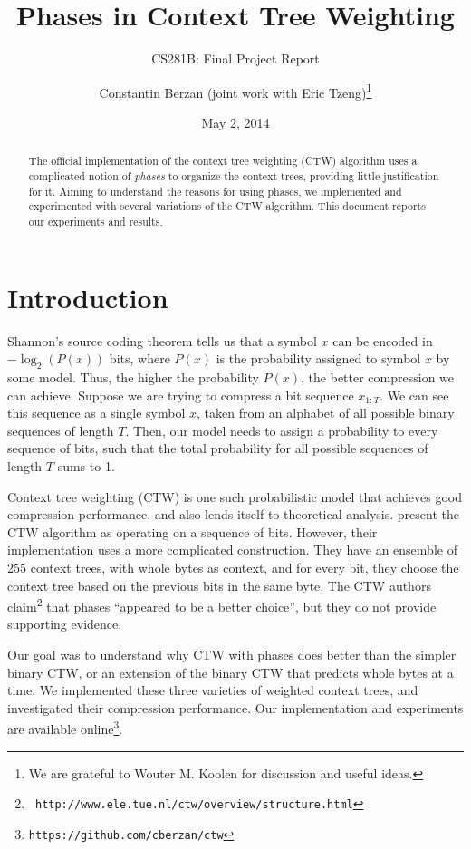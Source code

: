 \documentclass[11pt]{scrartcl}
\title{Phases in Context Tree Weighting}
\subtitle{CS281B: Final Project Report}
\author{Constantin Berzan (joint work with Eric Tzeng)\footnote{We are grateful
to Wouter M. Koolen for discussion and useful ideas.}}
\date{May 2, 2014}
\begin{document}
\maketitle

\begin{abstract}
The official implementation of the context tree weighting (CTW) algorithm uses
a complicated notion of {\em phases} to organize the context trees, providing
little justification for it. Aiming to understand the reasons for using phases,
we implemented and experimented with several variations of the CTW algorithm.
This document reports our experiments and results.
\end{abstract}

\section{Introduction}
\label{sec:intro}

Shannon's source coding theorem tells us that a symbol $x$ can be encoded in
$-\log_2(P(x))$ bits, where $P(x)$ is the probability assigned to symbol $x$ by
some model. Thus, the higher the probability $P(x)$, the better compression we
can achieve. Suppose we are trying to compress a bit sequence $x_{1:T}$. We can
see this sequence as a single symbol $x$, taken from an alphabet of all
possible binary sequences of length $T$. Then, our model needs to assign a
probability to every sequence of bits, such that the total probability for all
possible sequences of length $T$ sums to 1.

Context tree weighting (CTW) is one such probabilistic model that achieves good
compression performance, and also lends itself to theoretical analysis.
\textcite{eidma} present the CTW algorithm as operating on a sequence of bits.
However, their implementation uses a more complicated construction. They have
an ensemble of 255 context trees, with whole bytes as context, and for every
bit, they choose the context tree based on the previous bits in the same byte.
The CTW authors claim\footnote{{\tt
http://www.ele.tue.nl/ctw/overview/structure.html}} that phases ``appeared to
be a better choice'', but they do not provide supporting evidence.

Our goal was to understand why CTW with phases does better than the simpler
binary CTW, or an extension of the binary CTW that predicts whole bytes at a
time. We implemented these three varieties of weighted context trees, and
investigated their compression performance. Our implementation and experiments
are available online\footnote{{\tt https://github.com/cberzan/ctw}}.
\end{document}
